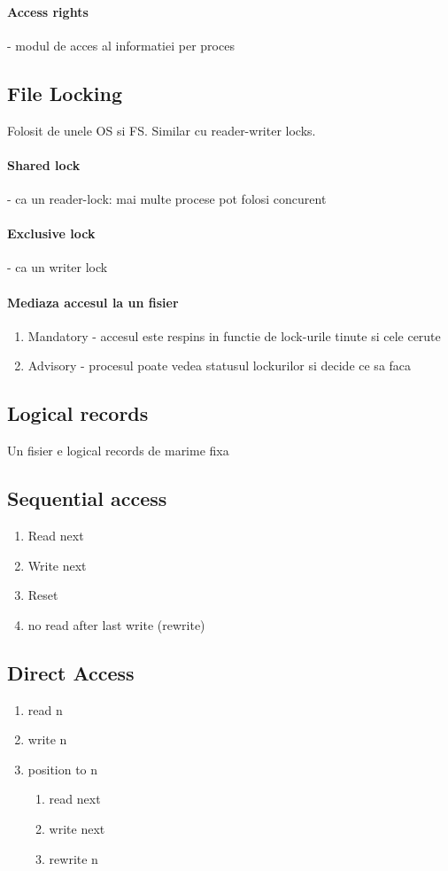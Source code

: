\documentclass{article}
\begin{document}
\paragraph*{Access rights} - modul de acces al informatiei per proces

\subsection*{File Locking}
Folosit de unele OS si FS. Similar cu reader-writer locks.
\paragraph*{Shared lock} - ca un reader-lock: mai multe procese pot folosi concurent
\paragraph*{Exclusive lock} - ca un writer lock
\paragraph*{Mediaza accesul la un fisier}
\begin{enumerate}
    \item Mandatory - accesul este respins in functie de lock-urile tinute si cele cerute
    \item Advisory - procesul poate vedea statusul lockurilor si decide ce sa faca
\end{enumerate}

\subsection*{Logical records}
Un fisier e logical records de marime fixa

\subsection*{Sequential access}
\begin{enumerate}
    \item Read next
    \item Write next
    \item Reset
    \item no read after last write (rewrite)
\end{enumerate}

\subsection*{Direct Access}
\begin{enumerate}
    \item read n
    \item write n
    \item position to n
          \begin{enumerate}
              \item read next
              \item write next
              \item rewrite n
          \end{enumerate}
\end{enumerate}
\end{document}
